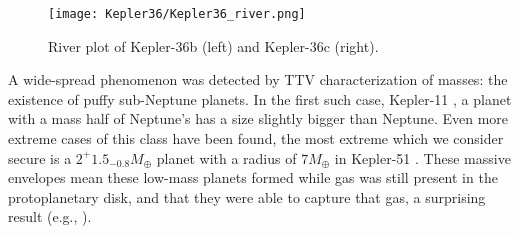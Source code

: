 \documentclass[graybox,natbib,nosecnum]{svmult}
\begin{document}
\begin{figure}
\centerline{
\texttt{[image: Kepler36/Kepler36\_river.png]}}
\caption{River plot of Kepler-36b (left) and Kepler-36c (right).}
\label{fig:kep36}
\end{figure}


A wide-spread phenomenon was detected by TTV characterization of masses: the existence of puffy sub-Neptune planets.  In the first such case, Kepler-11 \citep{2011Natur.470...53L}, a planet with a mass half of Neptune's has a size slightly bigger than Neptune.  Even more extreme cases of this class have been found, the most extreme which we consider secure is a $2^+1.5_{-0.8} M_\oplus$ planet with a radius of $7 M_\oplus$ in Kepler-51 \citep{2014ApJ...783...53M}.  These massive envelopes mean these low-mass planets formed while gas was still present in the protoplanetary disk, and that they were able to capture that gas, a surprising result (e.g., \citep{2016ApJ...817...90L,2016ApJ...825...29G}). 
 
\end{document}
